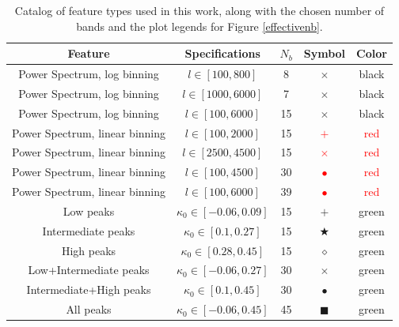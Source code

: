 \documentclass[reprint,aps,prd,superscriptaddress,showkeys,showpacs]{revtex4-1}
\begin{document}
\begin{table}
\begin{center}
\begin{tabular}{ccccc}
\toprule
\textbf{Feature} &  \textbf{Specifications} & $N_b$ &  \textbf{Symbol} & \textbf{Color} \\ \hline \hline
\midrule
Power Spectrum, log binning  & $l \in [100,800] $ & 8 & $\times$ & black  \\ 
Power Spectrum, log binning  & $l \in [1000,6000] $ & 7 & $\times$ & black  \\ 
Power Spectrum, log binning  & $l \in [100,6000] $ & 15 & $\times$ & black  \\
Power Spectrum, linear binning  & $l \in [100,2000] $ & 15 & \textcolor{red}{$+$} & \textcolor{red}{red}  \\ 
Power Spectrum, linear binning  & $l \in [2500,4500] $ & 15 & \textcolor{red}{$\times$} & \textcolor{red}{red}  \\
Power Spectrum, linear binning  & $l \in [100,4500] $ & 30 & \textcolor{red}{$\bullet$} & \textcolor{red}{red}  \\ 
Power Spectrum, linear binning  & $l \in [100,6000] $ & 39 & \textcolor{red}{$\bullet$} & \textcolor{red}{red}  \\ \hline
Low peaks  & $\kappa_0 \in [-0.06,0.09] $ & 15 & \textcolor{OliveGreen}{$+$} & \textcolor{OliveGreen}{green}  \\ 
Intermediate peaks  & $\kappa_0 \in [0.1,0.27] $ & 15 & \textcolor{OliveGreen}{$\bigstar$} & \textcolor{OliveGreen}{green}  \\ 
High peaks  & $\kappa_0 \in [0.28,0.45] $ & 15 & \textcolor{OliveGreen}{$\diamond$} & \textcolor{OliveGreen}{green}  \\
Low+Intermediate peaks  & $\kappa_0 \in [-0.06,0.27] $ & 30 & \textcolor{OliveGreen}{$\times$} & \textcolor{OliveGreen}{green}  \\
Intermediate+High peaks  & $\kappa_0 \in [0.1,0.45] $ & 30 & \textcolor{OliveGreen}{$\bullet$} & \textcolor{OliveGreen}{green}  \\
All peaks  & $\kappa_0 \in [-0.06,0.45] $ & 45 & \textcolor{OliveGreen}{$\blacksquare$} & \textcolor{OliveGreen}{green}  \\ \hline
\bottomrule
\end{tabular}
\end{center}
\caption{Catalog of feature types used in this work, along with the chosen number of bands and the plot legends for Figure \ref{effectivenb}.}
\label{featuretable}
\end{table}
\end{document}
